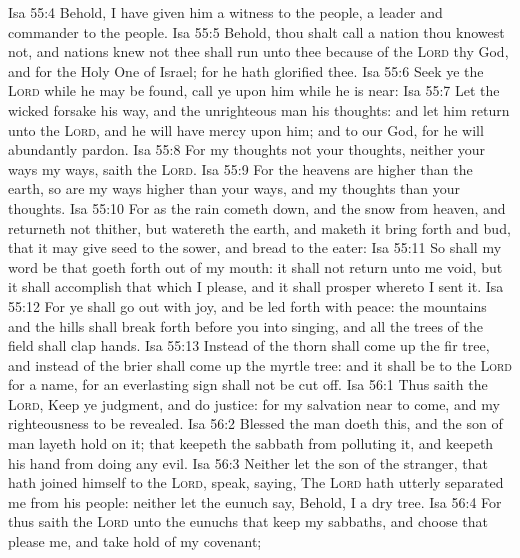 \vs Isa 55:4 Behold, I have given him  a witness to the people, a leader and commander to the people.
\vs Isa 55:5 Behold, thou shalt call a nation  thou knowest not, and nations  knew not thee shall run unto thee because of the \textsc{Lord} thy God, and for the Holy One of Israel; for he hath glorified thee.
\vs Isa 55:6 Seek ye the \textsc{Lord} while he may be found, call ye upon him while he is near:
\vs Isa 55:7 Let the wicked forsake his way, and the unrighteous man his thoughts: and let him return unto the \textsc{Lord}, and he will have mercy upon him; and to our God, for he will abundantly pardon.
\vs Isa 55:8 For my thoughts  not your thoughts, neither  your ways my ways, saith the \textsc{Lord}.
\vs Isa 55:9 For  the heavens are higher than the earth, so are my ways higher than your ways, and my thoughts than your thoughts.
\vs Isa 55:10 For as the rain cometh down, and the snow from heaven, and returneth not thither, but watereth the earth, and maketh it bring forth and bud, that it may give seed to the sower, and bread to the eater:
\vs Isa 55:11 So shall my word be that goeth forth out of my mouth: it shall not return unto me void, but it shall accomplish that which I please, and it shall prosper  whereto I sent it.
\vs Isa 55:12 For ye shall go out with joy, and be led forth with peace: the mountains and the hills shall break forth before you into singing, and all the trees of the field shall clap  hands.
\vs Isa 55:13 Instead of the thorn shall come up the fir tree, and instead of the brier shall come up the myrtle tree: and it shall be to the \textsc{Lord} for a name, for an everlasting sign  shall not be cut off.
\vs Isa 56:1 Thus saith the \textsc{Lord}, Keep ye judgment, and do justice: for my salvation  near to come, and my righteousness to be revealed.
\vs Isa 56:2 Blessed  the man  doeth this, and the son of man  layeth hold on it; that keepeth the sabbath from polluting it, and keepeth his hand from doing any evil.
\vs Isa 56:3 Neither let the son of the stranger, that hath joined himself to the \textsc{Lord}, speak, saying, The \textsc{Lord} hath utterly separated me from his people: neither let the eunuch say, Behold, I  a dry tree.
\vs Isa 56:4 For thus saith the \textsc{Lord} unto the eunuchs that keep my sabbaths, and choose  that please me, and take hold of my covenant;
